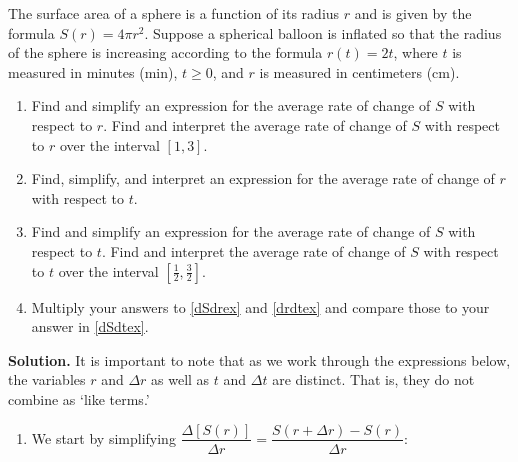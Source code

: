 \documentclass{ximera}
\begin{document}
\begin{ex}\label{surfaceareaex2chainrule}  The surface area of a sphere is a function of its radius $r$ and is given by the formula $S(r) = 4 \pi r^2$.  Suppose a spherical balloon is inflated so that the radius of the sphere is increasing according to the formula $r(t) = 2t$, where $t$ is measured in minutes (min), $t \geq 0$, and $r$ is measured in centimeters (cm). 

\begin{enumerate}

\item\label{dSdrex}  Find and simplify an expression for the average rate of change of $S$ with respect to $r$.   Find and interpret the average rate of change of $S$ with respect to $r$  over the interval $[1, 3]$.

\item\label{drdtex} Find, simplify, and interpret an expression for the average rate of change of $r$ with respect to $t$.

\item\label{dSdtex} Find and simplify an expression for the average rate of change of $S$ with respect to $t$.  Find and interpret the average rate of change of $S$ with respect to $t$  over the interval $\left[\frac{1}{2}, \frac{3}{2}\right]$.


\item  Multiply your answers to \ref{dSdrex} and \ref{drdtex} and compare those to your answer in \ref{dSdtex}.

\end{enumerate}

{\bf Solution.}  It is important to note that as we work through the expressions below, the variables $r$ and $\Delta r$ as well as $t$ and $\Delta t$ are distinct. That is, they do not combine as `like terms.'

\begin{enumerate}

\item  We start by simplifying $\dfrac{\Delta[S(r)]}{\Delta r} = \dfrac{S(r+ \Delta r) - S(r)}{\Delta r}$:

\begin{longtable}{rcl}


\end{longtable}
\end{enumerate}
\end{ex}
\end{document}
